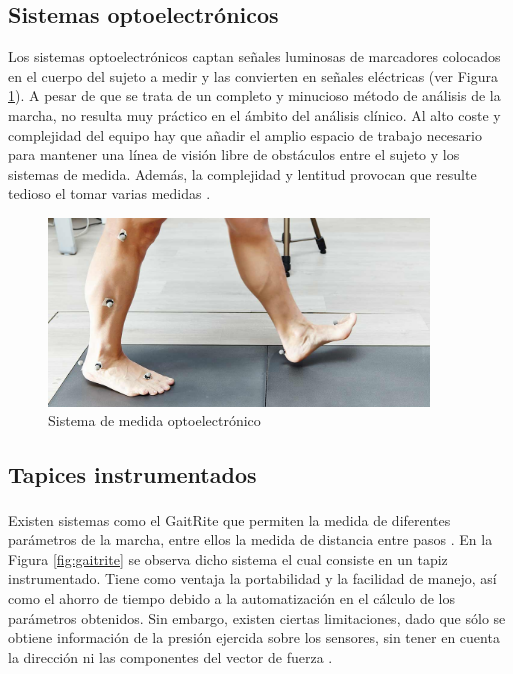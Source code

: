 	\subsection{Sistemas optoelectrónicos}
	
	Los sistemas optoelectrónicos captan señales luminosas de marcadores colocados en el cuerpo del sujeto a medir y las convierten en señales eléctricas (ver Figura \ref{fig:opt}). A pesar de que se trata de un completo y minucioso método de análisis de la marcha, no resulta muy práctico en el ámbito del análisis clínico. Al alto coste y complejidad del equipo hay que añadir el amplio espacio de trabajo necesario para mantener una línea de visión libre de obstáculos entre el sujeto y los sistemas de medida. Además, la complejidad y lentitud provocan que resulte tedioso el tomar varias medidas \cite{begona,opt}.
		\begin{figure}[H]
			\centering
			\includegraphics[width=0.9\textwidth]{./graphics/opt}
			\caption{Sistema de medida optoelectrónico} \label{fig:opt}
		\end{figure}

	\subsection{Tapices instrumentados}
	
	Existen sistemas como el GaitRite\textsuperscript{\textregistered} que permiten la medida de diferentes parámetros de la marcha, entre ellos la medida de distancia entre pasos \cite{gaitrite}. En la Figura \ref{fig:gaitrite} se observa dicho sistema el cual consiste en un tapiz instrumentado. Tiene como ventaja la portabilidad y la facilidad de manejo, así como el ahorro de tiempo debido a la automatización en el cálculo de los parámetros obtenidos. Sin embargo, existen ciertas limitaciones, dado que sólo se
	obtiene información de la presión ejercida sobre los sensores, sin tener en cuenta la
	dirección ni las componentes del vector de fuerza \cite{begona}. 
	
